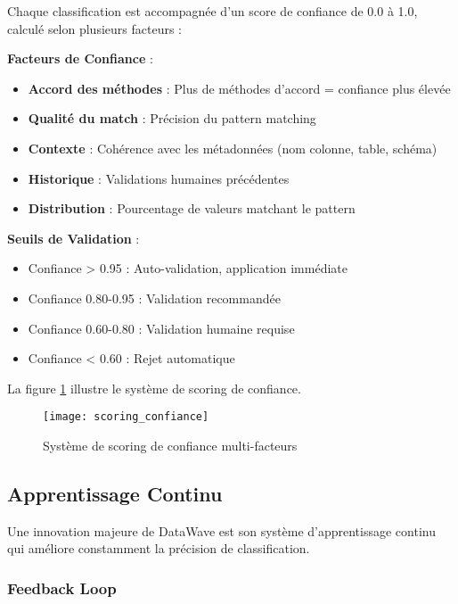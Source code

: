 Chaque classification est accompagnée d'un score de confiance de 0.0 à 1.0, calculé selon plusieurs facteurs :

\textbf{Facteurs de Confiance} :
\begin{itemize}
    \item \textbf{Accord des méthodes} : Plus de méthodes d'accord = confiance plus élevée
    \item \textbf{Qualité du match} : Précision du pattern matching
    \item \textbf{Contexte} : Cohérence avec les métadonnées (nom colonne, table, schéma)
    \item \textbf{Historique} : Validations humaines précédentes
    \item \textbf{Distribution} : Pourcentage de valeurs matchant le pattern
\end{itemize}

\textbf{Seuils de Validation} :
\begin{itemize}
    \item Confiance > 0.95 : Auto-validation, application immédiate
    \item Confiance 0.80-0.95 : Validation recommandée
    \item Confiance 0.60-0.80 : Validation humaine requise
    \item Confiance < 0.60 : Rejet automatique
\end{itemize}

La figure \ref{fig:scoring_confiance} illustre le système de scoring de confiance.

\begin{figure}[htpb]
\centering
\texttt{[image: scoring\_confiance]}
\caption{Système de scoring de confiance multi-facteurs}
\label{fig:scoring_confiance}
\end{figure}

\subsection{Apprentissage Continu}

Une innovation majeure de DataWave est son système d'apprentissage continu qui améliore constamment la précision de classification.

\subsubsection{Feedback Loop}

